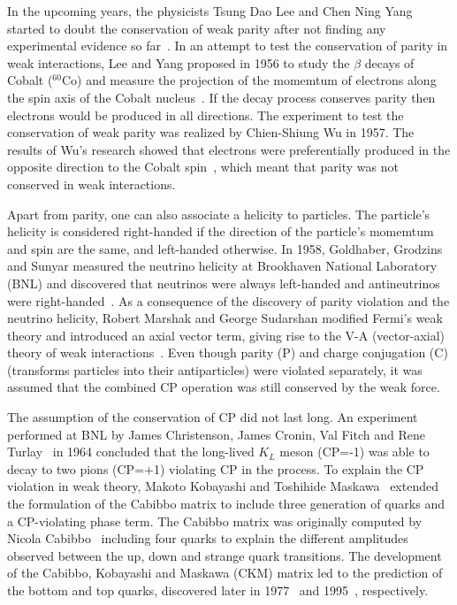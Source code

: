 In the upcoming years, the physicists Tsung Dao Lee and Chen Ning Yang started to doubt the conservation of weak parity after not finding any experimental evidence so far~\cite{LeeYang}. In an attempt to test the conservation of parity in weak interactions, Lee and Yang proposed in 1956 to study the $\beta$ decays of Cobalt (${}^{60}$Co) and measure the projection of the momemtum of electrons along the spin axis of the Cobalt nucleus~\cite{LeeYang}. If the decay process conserves parity then electrons would be produced in all directions. The experiment to test the conservation of weak parity was realized by Chien-Shiung Wu in 1957. The results of Wu's research showed that electrons were preferentially produced in the opposite direction to the Cobalt spin~\cite{WuParityViolation}, which meant that parity was not conserved in weak interactions.

Apart from parity, one can also associate a helicity to particles. The particle's helicity is considered right-handed if the direction of the particle's momemtum and spin are the same, and left-handed otherwise. In 1958, Goldhaber, Grodzins and Sunyar measured the neutrino helicity at Brookhaven National Laboratory (BNL) and discovered that neutrinos were always left-handed and antineutrinos were right-handed~\cite{NeutrinoHelicity}. As a consequence of the discovery of parity violation and the neutrino helicity, Robert Marshak and George Sudarshan modified Fermi's weak theory and introduced an axial vector term, giving rise to the V-A (vector-axial) theory of weak interactions~\cite{VATheory}. Even though parity (P) and charge conjugation (C) (transforms particles into their antiparticles) were violated separately, it was assumed that the combined CP operation was still conserved by the weak force.

The assumption of the conservation of CP did not last long. An experiment performed at BNL by James Christenson, James Cronin, Val Fitch and Rene Turlay~\cite{KMeson} in 1964 concluded that the long-lived $K_{L}$ meson (CP=-1) was able to decay to two pions (CP=+1) violating CP in the process. To explain the CP violation in weak theory, Makoto Kobayashi and Toshihide Maskawa~\cite{CKMMatrix} extended the formulation of the Cabibbo matrix to include three generation of quarks and a CP-violating phase term. The Cabibbo matrix was originally computed by Nicola Cabibbo~\cite{CabibboMatrix} including four quarks to explain the different amplitudes observed between the up, down and strange quark transitions. The development of the Cabibbo, Kobayashi and Maskawa (CKM) matrix led to the prediction of the bottom and top quarks, discovered later in 1977~\cite{BottomQuarkDiscovery} and 1995~\cite{TopQuarkDiscovery}, respectively.

